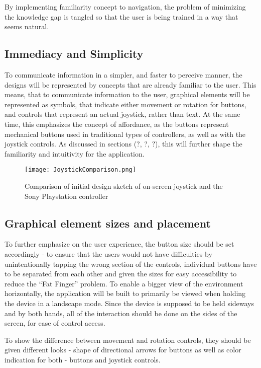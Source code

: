 By implementing familiarity concept to navigation, the problem of minimizing the knowledge gap is tangled so that the user is being trained in a way that seems natural.


\subsection{Immediacy and Simplicity}
To communicate information in a simpler, and faster to perceive manner, the designs will be represented by concepts that are already familiar to the user. This means, that to communicate information to the user, graphical elements will be represented as symbols, that indicate either movement or rotation for buttons, and controls that represent an actual joystick, rather than text. At the same time, this emphasizes the concept of affordance, as the buttons represent mechanical buttons used in traditional types of controllers, as well as with the joystick controls. As discussed in sections (?, ?, ?), this will further shape the familiarity and intuitivity for the application.

\begin{figure}[H]
\centering
\texttt{[image: JoystickComparison.png]}
\caption{Comparison of initial design sketch of on-screen joystick and the Sony Playstation controller}
\end{figure}

\subsection{Graphical element sizes and placement}
To further emphasize on the user experience, the button size should be set accordingly - to ensure that the users would not have difficulties by unintentionally tapping the wrong section of the controls, individual buttons have to be separated from each other and given the sizes for easy accessibility to reduce the “Fat Finger” problem.
To enable a bigger view of the environment horizontally, the application will be built to primarily be viewed when holding the device in a landscape mode. Since the device is supposed to be held sideways and by both hands, all of the interaction should be done on the sides of the screen, for ease of control access.

To show the difference between movement and rotation controls, they should be given different looks - shape of directional arrows for buttons as well as color indication for both - buttons and joystick controls.

